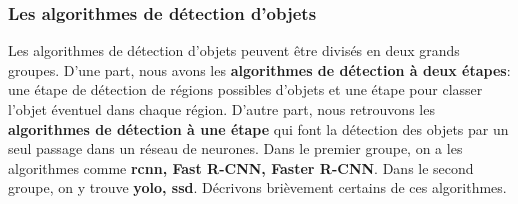         \subsubsection{Les algorithmes de détection d'objets}
        Les algorithmes de détection d’objets peuvent être divisés en deux grands groupes. D’une part, nous avons les \textbf{algorithmes de détection à deux étapes}: une étape de détection de régions possibles d’objets et une étape pour classer l'objet éventuel dans chaque région. D’autre part, nous retrouvons les \textbf{algorithmes de détection à une étape} qui font la détection des objets par un seul passage dans un réseau de neurones. Dans le premier groupe, on a les algorithmes comme \textbf{\acrshort{rcnn}, Fast R-CNN, Faster R-CNN}. Dans le second groupe, on y trouve \textbf{\acrshort{yolo}, \acrshort{ssd}}. Décrivons brièvement certains de ces algorithmes.
